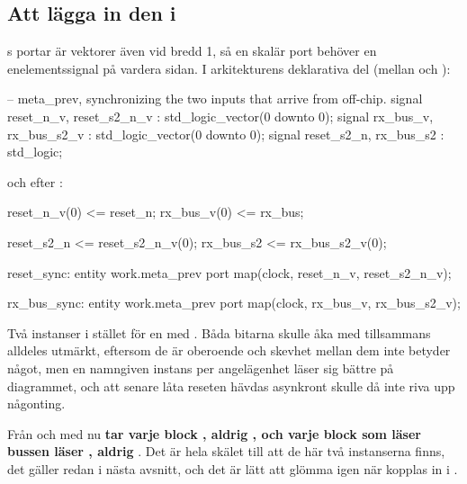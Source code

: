 \subsection{Att lägga in den i }
\label{c12:sub:mpwire}

s portar är vektorer även vid bredd 1, så en skalär port behöver en enelementssignal
på vardera sidan. I arkitekturens deklarativa del (mellan  och ):

\begin{vhdlcode}
    -- meta_prev, synchronizing the two inputs that arrive from off-chip.
    signal reset_n_v, reset_s2_n_v : std_logic_vector(0 downto 0);
    signal rx_bus_v,  rx_bus_s2_v  : std_logic_vector(0 downto 0);
    signal reset_s2_n, rx_bus_s2   : std_logic;
\end{vhdlcode}

och efter :

\begin{vhdlcode}
    reset_n_v(0) <= reset_n;
    rx_bus_v(0)  <= rx_bus;

    reset_s2_n <= reset_s2_n_v(0);
    rx_bus_s2  <= rx_bus_s2_v(0);

    reset_sync: entity work.meta_prev
        port map(clock, reset_n_v, reset_s2_n_v);

    rx_bus_sync: entity work.meta_prev
        port map(clock, rx_bus_v, rx_bus_s2_v);
\end{vhdlcode}

Två instanser i stället för en med . Båda bitarna skulle åka med tillsammans
alldeles utmärkt, eftersom de är oberoende och skevhet mellan dem inte betyder något, men en namngiven
instans per angelägenhet läser sig bättre på diagrammet, och att senare låta reseten hävdas asynkront
skulle då inte riva upp någonting.

Från och med nu \textbf{tar varje block , aldrig , och varje block som
läser bussen läser , aldrig }. Det är hela skälet till att de här två
instanserna finns, det gäller  redan i nästa avsnitt, och det är lätt att glömma igen
när  kopplas in i .
